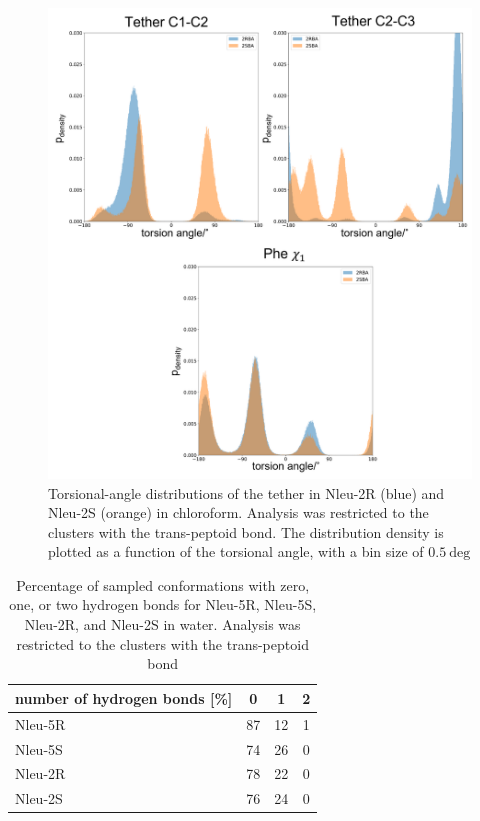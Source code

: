 \begin{figure}[h!]
    \centering
    \includegraphics[width=\textwidth]{7_chapter_5/fig/results/dihedral_dist_Wat.png}
    \caption{Torsional-angle distributions of the tether in Nleu-2R (blue) and Nleu-2S  (orange)  in  chloroform.  Analysis  was  restricted  to  the clusters  with  the  trans-peptoid bond. The distribution density is plotted as a function of the torsional angle, with a bin size of $0.5~\text{deg}$}
    \label{fig: SITorsion2RS}
\end{figure}


\FloatBarrier

\begin{table}[h!]
    \centering
    \caption{Percentage of sampled conformations with zero, one, or two hydrogen bonds
for Nleu-5R, Nleu-5S, Nleu-2R, and Nleu-2S in water. Analysis was restricted to the
clusters with the trans-peptoid bond}
    \label{tab: hbondsratiowater}
    \begin{adjustbox}{max width=\textwidth}
    \begin{tabular}{lccc}
    number of hydrogen bonds [\%] &	0 &	1 &	2 \\
    \hline
    Nleu-5R  &	87	& 12	& 1 \\
    Nleu-5S  &	74	& 26	& 0  \\
    Nleu-2R  &	78	& 22	& 0 \\
    Nleu-2S  &	76	& 24	& 0 \\
    \hline
    \end{tabular}
    \end{adjustbox}
\end{table}

